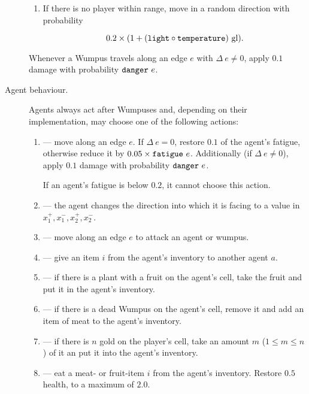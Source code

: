 \begin{definition}
\begin{description}
\begin{enumerate}
		\item If there is no player within range, move in a random direction with probability
		
		$$
			0.2 \times (1 + (\mathtt{light} \circ \mathtt{temperature})\ \mathrm{gl}).
		$$
	\end{enumerate}
	
	Whenever a Wumpus travels along an edge $e$ with $\Delta\ e \neq 0$, apply $0.1$ damage with probability $\field{danger}\ e$.
	
	\item[Agent behaviour.] Agents always act after Wumpuses and, depending on their implementation, may choose one of the following actions:
	
	\begin{enumerate}\label{lst:agentBehavior}
		\item[\action{move}] --- move along an edge $e$. If $\Delta\ e = 0$, restore $0.1$ of the agent's fatigue, otherwise reduce it by $0.05 \times \mathtt{fatigue}\ e$. Additionally (if $\Delta\ e \neq 0$), apply $0.1$ damage with probability $\field{danger}\ e$.
		
		If an agent's fatigue is below $0.2$, it cannot choose this action.
		
		\item[\action{rotate}] --- the agent changes the direction into which it is facing to a value in ${x_1^+,x_1^-,x_2^+,x_2^-}$.
		
		\item[\action{attack}] --- move along an edge $e$ to attack an agent or wumpus.
		
		\item[\action{give}] --- give an item $i$ from the agent's inventory to another agent $a$.
		
		\item[\action{gather}] --- if there is a plant with a fruit on the agent's cell, take the fruit and put it in the agent's inventory.
		
		\item[\action{butcher}] --- if there is a dead Wumpus on the agent's cell, remove it and add an item of meat to the agent's inventory.
		
		\item[\action{collect}] --- if there is $n$ gold on the player's cell, take an amount $m$ ($1 \leq m \leq n$) of it an put it into the agent's inventory.
		
		\item[\action{eat}] --- eat a meat- or fruit-item $i$ from the agent's inventory. Restore $0.5$ health, to a maximum of $2.0$.
		

\end{enumerate}
\end{description}
\end{definition}

